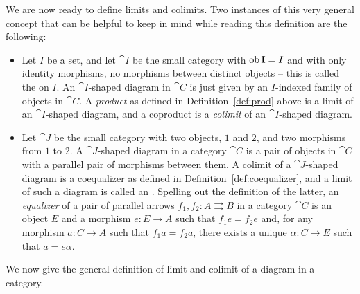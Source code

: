 We are now ready to define limits and colimits. Two instances of this very general concept that can be helpful to keep in mind while reading this definition are the following:
\begin{itemize}
\item Let $I$ be a set, and let $\cat{I}$ be the small category with
$\operatorname{\mathrm{ob}}{\mathbf{I}} = I$ and with only identity morphisms, no morphisms between
distinct objects -- this is called the  on $I$. An
$\cat{I}$-shaped diagram in $\cat{C}$ is just given by an $I$-indexed family of objects in $\cat{C}$. A \emph{product} as defined in
Definition~\ref{def:prod} above is a limit of an $\cat{I}$-shaped diagram, and a
coproduct is a \emph{colimit} of an
$\cat{I}$-shaped diagram.  
\item Let $\cat{J}$ be the small category with two objects, $1$ and $2$, and two
morphisms from $1$ to $2$. A $\cat{J}$-shaped diagram in a category $\cat{C}$ is
a pair of objects in $\cat{C}$ with a parallel pair of morphisms between them. A
colimit of a $\cat{J}$-shaped diagram is a coequalizer as defined in
Definition~\ref{def:coequalizer}, and a limit of such a diagram is called an 
.
Spelling out the definition of the latter, an \emph{equalizer} of a pair of parallel arrows $f_1, f_2 \colon A \rightrightarrows B$ in a category $\cat{C}$ is an object $E$ and a morphism $e \colon E \to A$ such that $f_1e = f_2e$ and, for any morphism $a \colon C \to A$ such that $f_1a = f_2a$, there exists a unique $\alpha \colon C \to E$ such that $a = e\alpha$.
\end{itemize}
We now give the general definition of limit and colimit of a diagram in a category.
